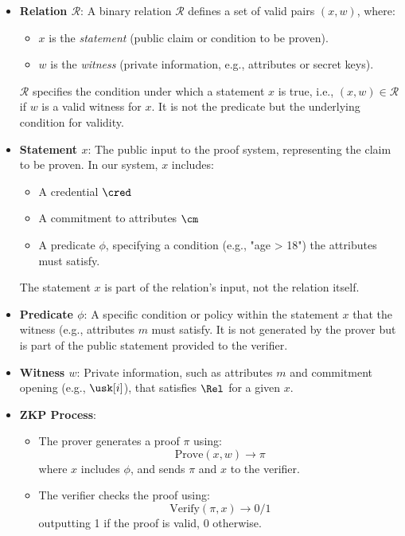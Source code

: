 \begin{itemize}
    \item \textbf{Relation \(\mathcal{R}\)}: A binary relation \(\mathcal{R}\) defines a set of valid pairs \((x, w)\), where:
    \begin{itemize}
        \item \(x\) is the \emph{statement} (public claim or condition to be proven).
        \item \(w\) is the \emph{witness} (private information, e.g., attributes or secret keys).
    \end{itemize}
    \(\mathcal{R}\) specifies the condition under which a statement \(x\) is true, i.e., \((x, w) \in \mathcal{R}\) if \(w\) is a valid witness for \(x\). It is not the predicate but the underlying condition for validity.

    \item \textbf{Statement \(x\)}: The public input to the proof system, representing the claim to be proven. In our system, \(x\) includes:
    \begin{itemize}
        \item A credential $\cred$
        \item A commitment to attributes $\cm$
        \item A predicate $\phi$, specifying a condition (e.g., "age > 18") the attributes must satisfy.
    \end{itemize}
    The statement $x$ is part of the relation's input, not the relation itself.

    \item \textbf{Predicate $\phi$}: A specific condition or policy within the statement $x$ that the witness (e.g., attributes $m$ must satisfy. It is not generated by the prover but is part of the public statement provided to the verifier.

    \item \textbf{Witness $w$}: Private information, such as attributes $m$ and commitment opening (e.g., $\usk[i]$), that satisfies $\Rel$ for a given $x$.

    \item \textbf{ZKP Process}:
    \begin{itemize}
        \item The prover generates a proof $\pi$ using:
        \[
        \text{Prove}(x, w) \rightarrow \pi
        \]
        where $x$ includes $\phi$, and sends $\pi$ and $x$ to the verifier.
        \item The verifier checks the proof using:
        \[
        \text{Verify}(\pi, x) \rightarrow 0/1
        \]
        outputting 1 if the proof is valid, 0 otherwise.
    \end{itemize}
\end{itemize}

